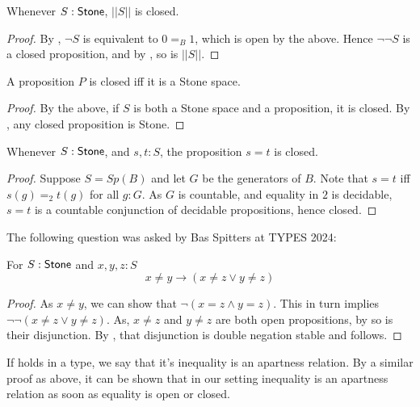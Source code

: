 \begin{corollary}\label{TruncationStoneClosed}
  Whenever $S:\mathsf{Stone}$, $||S||$ is closed. 
\end{corollary}
\begin{proof}
  By , $\neg S$ is equivalent to $0=_B 1$, which is open by the above. 
  Hence $\neg \neg S$ is a closed proposition, and by , so is $||S||$. 
\end{proof}


\begin{corollary}\label{PropositionsClosedIffStone}
  A proposition $P$ is closed iff it is a Stone space. 
\end{corollary}
\begin{proof}
  By the above, if $S$ is both a Stone space and a proposition, it is closed. 
  By , any closed proposition is Stone. 
\end{proof}

\begin{lemma}\label{StoneEqualityClosed}
  Whenever $S:\mathsf{Stone}$, and $s,t:S$, the proposition $s=t$ is closed. 
\end{lemma}
\begin{proof}
  Suppose $S= Sp(B)$ and let $G$ be the generators of $B$. 
  Note that $s=t$ iff $s(g) =_2 t(g)$ for all $g:G$. 
  As $G$ is countable, and equality in $2$ is decidable, 
  $s=t$ is a countable conjunction of decidable propositions, hence 
  closed. 
\end{proof}
%
The following question was asked by Bas Spitters at TYPES 2024:
\begin{corollary}
  For $S:\mathsf{Stone}$ and $x,y,z:S$ 
  \begin{equation}\label{Apartness}
  x \neq y \to (x\neq z \vee y \neq z)
  \end{equation}
\end{corollary}
\begin{proof}
  As $x\neq y$, we can show that $\neg ( x = z \wedge y = z)$. 
  This in turn implies $\neg \neg ( x \neq  z \vee y \neq  z)$. 
  As, $x\neq z$ and $y \neq z$ are both open propositions, by  so is their disjunction. 
  By , that disjunction is double negation stable and  follows. 
\end{proof}
\begin{remark}
  If  holds in a type, we say that it's inequality is an apartness relation. 
  By a similar proof as above, it can be shown that in our setting inequality is an apartness relation 
  as soon as equality is open or closed. 
\end{remark}
